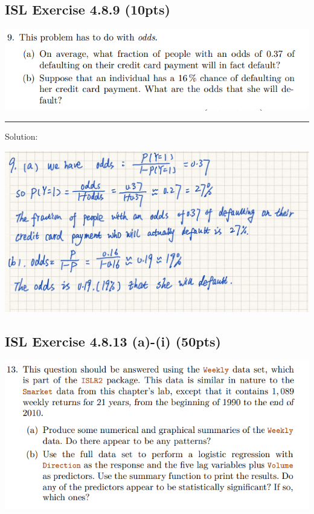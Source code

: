 \documentclass[
]{article}
\begin{document}
\hypertarget{isl-exercise-4.8.9-10pts}{%
\subsection{ISL Exercise 4.8.9 (10pts)}\label{isl-exercise-4.8.9-10pts}}

\includegraphics{images/clipboard-2955947930.png}

\begin{center}\rule{0.5\linewidth}{0.5pt}\end{center}

Solution:

\includegraphics[width=7.03125in,height=\textheight]{images/clipboard-3451261091.jpeg}

\hypertarget{isl-exercise-4.8.13-a-i-50pts}{%
\subsection{ISL Exercise 4.8.13 (a)-(i)
(50pts)}\label{isl-exercise-4.8.13-a-i-50pts}}

\includegraphics[width=6.94792in,height=\textheight]{images/clipboard-2962329981.png}
\end{document}
